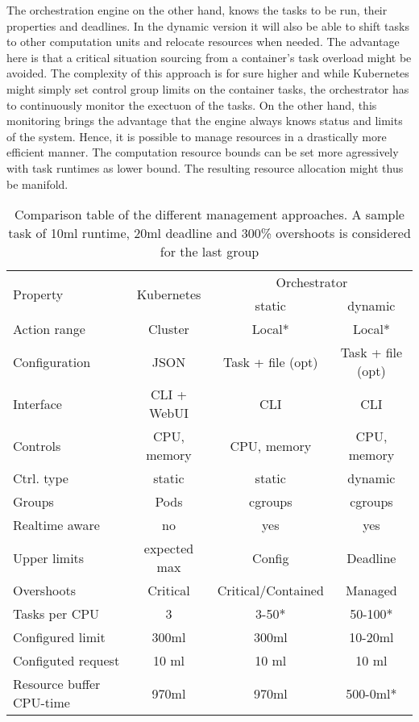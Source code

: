 \documentclass[]{scrartcl}
\begin{document}
The orchestration engine on the other hand, knows the tasks to be run, their properties and deadlines.
In the dynamic version it will also be able to shift tasks to other computation units and relocate resources when needed.
The advantage here is that a critical situation sourcing from a container's task overload might be avoided.
The complexity of this approach is for sure higher and while Kubernetes might simply set control group limits on the container tasks, the orchestrator has to continuously monitor the exectuon of the tasks.
On the other hand, this monitoring brings the advantage that the engine always knows status and limits of the system. 
Hence, it is possible to manage resources in a drastically more efficient manner. The computation resource bounds can be set more agressively with %
task runtimes as lower bound. 
The resulting resource allocation might thus be manifold.

\begin{table}[ht]
	\centering
	\begin{tabular}{l c c c}
		 \multirow{2}{*}{Property} & \multirow{2}{*}{Kubernetes} & \multicolumn{2}{c}{Orchestrator} \\
		& & static & dynamic \\
		\toprule
		Action range & Cluster & Local* & Local* \\
		Configuration & JSON & Task + file (opt) & Task + file (opt) \\
		Interface & CLI + WebUI & CLI & CLI \\
		\midrule
		Controls & CPU, memory & CPU, memory & CPU, memory\\
		Ctrl. type & static & static & dynamic\\
		Groups & Pods & cgroups & cgroups \\
		Realtime aware & no & yes & yes\\
		\midrule
		Upper limits & expected max & Config & Deadline \\
		Overshoots & Critical & Critical/Contained & Managed \\
		\midrule
		Tasks per CPU & 3 & 3-50* & 50-100*\\
		Configured limit & 300ml & 300ml & 10-20ml\\
		Configuted request & 10 ml & 10 ml & 10 ml \\
		Resource buffer CPU-time & 970ml & 970ml & 500-0ml*\\
		\bottomrule
	\end{tabular}
	\caption{Comparison table of the different management approaches. A sample task of 10ml runtime,
		20ml deadline and 300\% overshoots is considered for the last group}
	\label{tab:approach}
\end{table}
\end{document}

